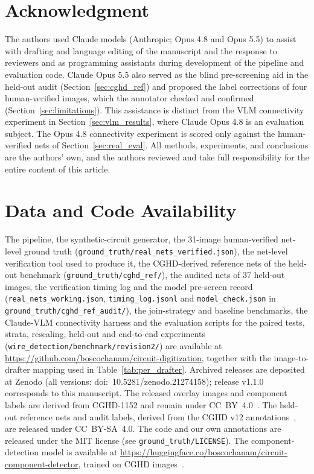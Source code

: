 \documentclass{ieeeaccess}
\begin{document}
\section*{Acknowledgment}
The authors used Claude models (Anthropic; Opus 4.8 and Opus 5.5) to assist with drafting and language editing of the manuscript and the response to reviewers and as programming assistants during development of the pipeline and evaluation code. Claude Opus 5.5 also served as the blind pre-screening aid in the held-out audit (Section~\ref{sec:cghd_ref}) and proposed the label corrections of four human-verified images, which the annotator checked and confirmed (Section~\ref{sec:limitations}). This assistance is distinct from the VLM connectivity experiment in Section~\ref{sec:vlm_results}, where Claude Opus 4.8 is an evaluation subject. The Opus 4.8 connectivity experiment is scored only against the human-verified nets of Section~\ref{sec:real_eval}. All methods, experiments, and conclusions are the authors' own, and the authors reviewed and take full responsibility for the entire content of this article.

\section*{Data and Code Availability}
The pipeline, the synthetic-circuit generator, the 31-image human-verified net-level ground truth (\texttt{ground\_truth/real\_nets\_verified.json}), the net-level verification tool used to produce it, the CGHD-derived reference nets of the held-out benchmark (\texttt{ground\_truth/cghd\_ref/}), the audited nets of 37 held-out images, the verification timing log and the model pre-screen record (\texttt{real\_nets\_working.json}, \texttt{timing\_log.jsonl} and \texttt{model\_check.json} in \texttt{ground\_truth/cghd\_ref\_audit/}), the join-strategy and baseline benchmarks, the Claude-VLM connectivity harness and the evaluation scripts for the paired tests, strata, rescaling, held-out and end-to-end experiments (\texttt{wire\_detection/benchmark/revision2/}) are available at \url{https://github.com/boscochanam/circuit-digitization}, together with the image-to-drafter mapping used in Table~\ref{tab:per_drafter}. Archived releases are deposited at Zenodo (all versions: doi:~10.5281/zenodo.21274158); release v1.1.0 corresponds to this manuscript. The released overlay images and component labels are derived from CGHD-1152 and remain under CC~BY~4.0~\cite{cghd1152data}. The held-out reference nets and audit labels, derived from the CGHD v12 annotations~\cite{cghdv12data}, are released under CC~BY-SA~4.0. The code and our own annotations are released under the MIT license (see \texttt{ground\_truth/LICENSE}). The component-detection model is available at \url{https://huggingface.co/boscochanam/circuit-component-detector}, trained on CGHD images~\cite{bayer2021cghd,cghd1152data}.
\end{document}

